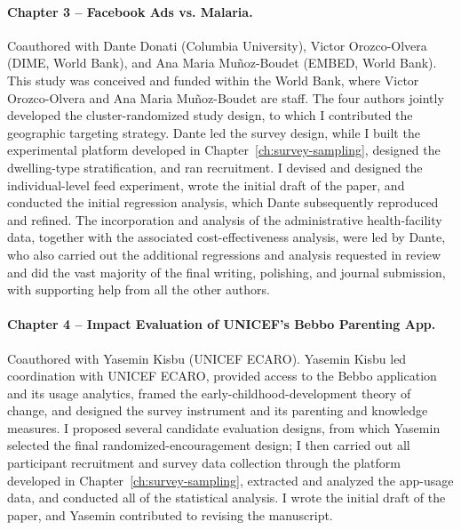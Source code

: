 \paragraph{Chapter 3 -- Facebook Ads vs. Malaria.}
Coauthored with Dante Donati (Columbia University), Victor Orozco-Olvera (DIME,
World Bank), and Ana Maria Mu\~noz-Boudet (EMBED, World Bank).
This study was conceived and funded within the World Bank, where Victor
Orozco-Olvera and Ana Maria Mu\~noz-Boudet are staff. The four authors jointly developed the cluster-randomized
study design, to which I contributed the geographic targeting strategy. Dante led
the survey design, while I built the experimental platform developed in
Chapter~\ref{ch:survey-sampling}, designed the dwelling-type stratification, and
ran recruitment. I devised and designed the individual-level feed experiment,
wrote the initial draft of the paper, and conducted the initial regression
analysis, which Dante subsequently reproduced and refined. The incorporation and
analysis of the administrative health-facility data, together with the associated
cost-effectiveness analysis, were led by Dante, who also carried out the
additional regressions and analysis requested in review and did the vast majority of the
final writing, polishing, and journal submission, with supporting help from all the other authors. 

\paragraph{Chapter 4 -- Impact Evaluation of UNICEF's Bebbo Parenting App.}
Coauthored with Yasemin Kisbu (UNICEF ECARO).
Yasemin Kisbu led coordination with UNICEF ECARO, provided access to the Bebbo
application and its usage analytics, framed the early-childhood-development theory
of change, and designed the survey instrument and its parenting and knowledge
measures. I proposed several candidate evaluation designs, from which Yasemin
selected the final randomized-encouragement design; I then carried out all
participant recruitment and survey data collection through the platform developed
in Chapter~\ref{ch:survey-sampling}, extracted and analyzed the app-usage data,
and conducted all of the statistical analysis. I wrote the initial draft of the
paper, and Yasemin contributed to revising the manuscript.

\cleardoublepage
